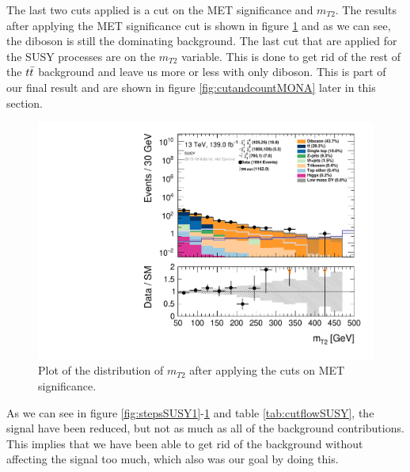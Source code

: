 The last two cuts applied is a cut on the MET significance and $m_{T2}$. The results after applying the MET significance cut is shown in figure \ref{fig:stepsSUSY3} and as we can see, the diboson is still the dominating background. The last cut that are applied for the SUSY processes are on the $m_{T2}$ variable. This is done to get rid of the rest of the $t\Bar{t}$ background and leave us more or less with only diboson. This is part of our final result and are shown in figure \ref{fig:cutandcountMONA} later in this section.

\begin{figure}[H]
    \centering
        \includegraphics[width=\textwidth]{Figures/SUSYcuts/hist1d_mt2_SUSY.pdf}
    \caption{Plot of the distribution of $m_{T2}$ after applying the cuts on MET significance.}
    \label{fig:stepsSUSY3}
\end{figure}

As we can see in figure \ref{fig:stepsSUSY1}-\ref{fig:stepsSUSY3} and table \ref{tab:cutflowSUSY}, the signal have been reduced, but not as much as all of the background contributions. This implies that we have been able to get rid of the background without affecting the signal too much, which also was our goal by doing this. 


